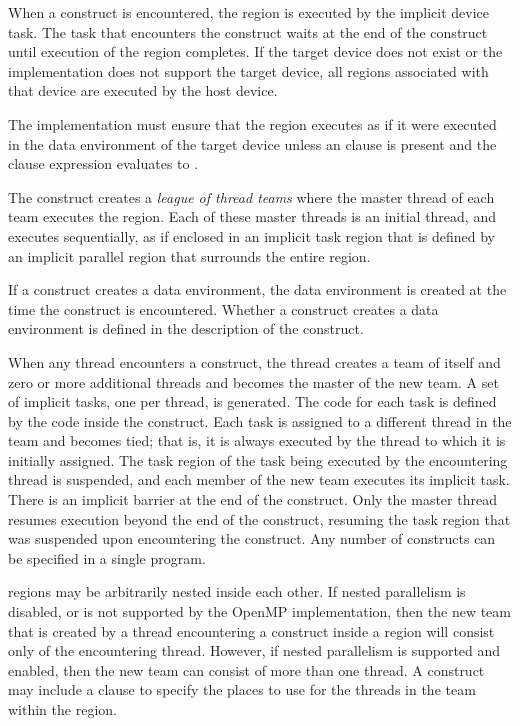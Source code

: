 When a  construct is encountered, the  region is executed by the
implicit device task. The task that encounters the  construct waits at the end of
the construct until execution of the region completes.  If the target device does not exist or the implementation does not support the target device, all  regions associated with that device are executed by the host device.

The implementation must ensure that the  region executes as if it were executed in the data environment of the target device unless an  clause is present and the  clause expression evaluates to .

The  construct creates a \emph{league of thread teams} 
where the master thread of each
team executes the region. Each of these master threads is an initial thread, and executes
sequentially, as if enclosed in an implicit task region that is defined by an implicit
parallel region that surrounds the entire  region.

If a construct creates a data environment, the data environment is created at the time the
construct is encountered. Whether a construct creates a data environment is defined in 
the description of the construct.

When any thread encounters a  construct, the thread creates a team of itself
and zero or more additional threads and becomes the master of the new team. A set of 
implicit tasks, one per thread, is generated. The code for each task is defined by the code 
inside the  construct. Each task is assigned to a different thread in the team
and becomes tied; that is, it is always executed by the thread to which it is initially 
assigned. The task region of the task being executed by the encountering thread is 
suspended, and each member of the new team executes its implicit task. There is an 
implicit barrier at the end of the  construct. Only the master thread resumes
execution beyond the end of the  construct, resuming the task region that
was suspended upon encountering the  construct. Any number of
 constructs can be specified in a single program.

 regions may be arbitrarily nested inside each other. If nested parallelism is
disabled, or is not supported by the OpenMP implementation, then the new team that is 
created by a thread encountering a  construct inside a  region
will consist only of the encountering thread. However, if nested parallelism is supported 
and enabled, then the new team can consist of more than one thread. A 
construct may include a  clause to specify the places to use for the threads
in the team within the  region.


